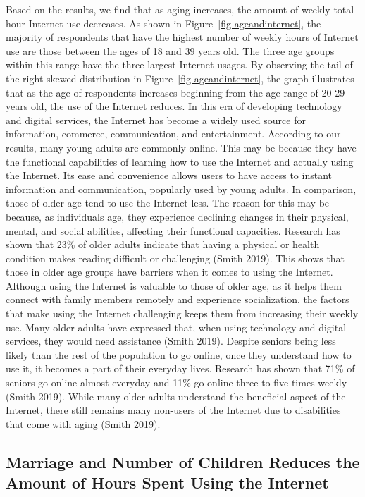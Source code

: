 \documentclass[
]{article}
\begin{document}
Based on the results, we find that as aging increases, the amount of
weekly total hour Internet use decreases. As shown in
Figure~\ref{fig-ageandinternet}, the majority of respondents that have
the highest number of weekly hours of Internet use are those between the
ages of 18 and 39 years old. The three age groups within this range have
the three largest Internet usages. By observing the tail of the
right-skewed distribution in Figure~\ref{fig-ageandinternet}, the graph
illustrates that as the age of respondents increases beginning from the
age range of 20-29 years old, the use of the Internet reduces. In this
era of developing technology and digital services, the Internet has
become a widely used source for information, commerce, communication,
and entertainment. According to our results, many young adults are
commonly online. This may be because they have the functional
capabilities of learning how to use the Internet and actually using the
Internet. Its ease and convenience allows users to have access to
instant information and communication, popularly used by young adults.
In comparison, those of older age tend to use the Internet less. The
reason for this may be because, as individuals age, they experience
declining changes in their physical, mental, and social abilities,
affecting their functional capacities. Research has shown that 23\% of
older adults indicate that having a physical or health condition makes
reading difficult or challenging (Smith 2019). This shows that those in
older age groups have barriers when it comes to using the Internet.
Although using the Internet is valuable to those of older age, as it
helps them connect with family members remotely and experience
socialization, the factors that make using the Internet challenging
keeps them from increasing their weekly use. Many older adults have
expressed that, when using technology and digital services, they would
need assistance (Smith 2019). Despite seniors being less likely than the
rest of the population to go online, once they understand how to use it,
it becomes a part of their everyday lives. Research has shown that 71\%
of seniors go online almost everyday and 11\% go online three to five
times weekly (Smith 2019). While many older adults understand the
beneficial aspect of the Internet, there still remains many non-users of
the Internet due to disabilities that come with aging (Smith 2019).

\hypertarget{sec-second-point}{%
\subsection{Marriage and Number of Children Reduces the Amount of Hours
Spent Using the Internet}\label{sec-second-point}}
\end{document}
